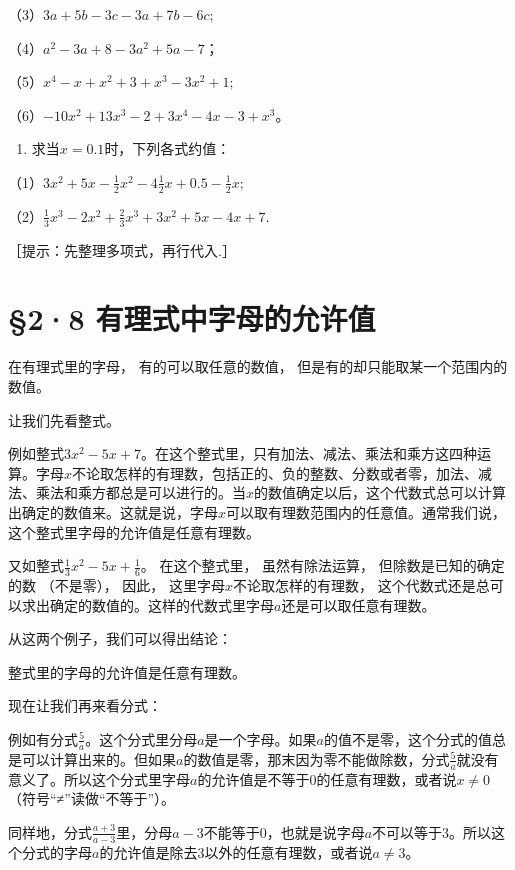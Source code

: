 （3）\(3a + 5b - 3c - 3a + 7b - 6c;\)

（4）\(a^2 - 3a + 8 - 3a^2 + 5a - 7\)；

（5）\(x^{4} - x + x^{2} + 3 + x^{3} - 3x^{2} + 1;\)

（6）\(-10x^{2} + 13x^{3} - 2 + 3x^{4} - 4x - 3 + x^{3}\)。

\begin{enumerate}[start=5]
\item
  求当\(x = 0.1\)时，下列各式约值：
\end{enumerate}

（1）\(3x^{2} + 5x - \frac{1}{2} x^{2} - 4\frac{1}{2} x + 0.5 - \frac{1}{2} x;\)

（2）\(\frac{1}{3} x^3 - 2x^2 + \frac{2}{3} x^3 + 3x^2 + 5x - 4x + 7.\)

［提示：先整理多项式，再行代入.］

\section{§2·8 有理式中字母的允许值}

在有理式里的字母， 有的可以取任意的数值，
但是有的却只能取某一个范围内的数值。

让我们先看整式。

例如整式\(3x^{2} - 5x + 7\)。在这个整式里，只有加法、减法、乘法和乘方这四种运算。字母\(x\)不论取怎样的有理数，包括正的、负的整数、分数或者零，加法、减法、乘法和乘方都总是可以进行的。当\(x\)的数值确定以后，这个代数式总可以计算出确定的数值来。这就是说，字母\(x\)可以取有理数范围内的任意值。通常我们说，这个整式里字母的允许值是任意有理数。

又如整式\(\frac{1}{3} x^2 - 5x + \frac{1}{6}\)。 在这个整式里，
虽然有除法运算， 但除数是已知的确定的数 （不是零）， 因此，
这里字母\(x\)不论取怎样的有理数，
这个代数式还是总可以求出确定的数值的。这样的代数式里字母\(a\)还是可以取任意有理数。

从这两个例子，我们可以得出结论：

整式里的字母的允许值是任意有理数。

现在让我们再来看分式：

例如有分式\(\frac{5}{a}\)。这个分式里分母\(a\)是一个字母。如果\(a\)的值不是零，这个分式的值总是可以计算出来的。但如果\(a\)的数值是零，那末因为零不能做除数，分式\(\frac{5}{a}\)就没有意义了。所以这个分式里字母\(a\)的允许值是不等于0的任意有理数，或者说\(x \neq 0\)（符号``≠''读做``不等于''）。

同样地，分式\(\frac{a + 3}{a - 3}\)里，分母\(a - 3\)不能等于0，也就是说字母\(a\)不可以等于3。所以这个分式的字母\(a\)的允许值是除去3以外的任意有理数，或者说\(a \neq 3\)。

